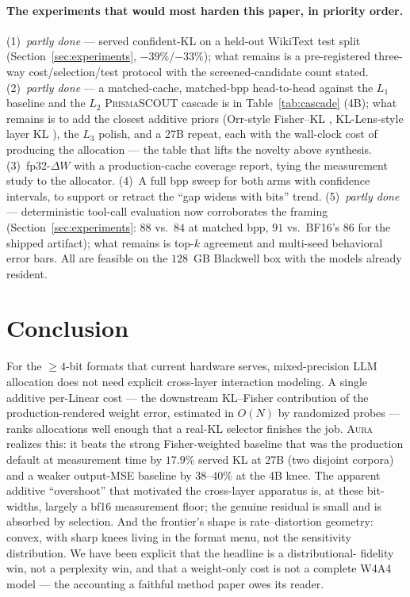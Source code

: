 \documentclass[11pt]{article}
\theoremstyle{plain}
\theoremstyle{definition}
\newcommand{\dW}{\Delta W}
\begin{document}
\paragraph{The experiments that would most harden this paper, in priority order.}
(1)~\emph{partly done} --- served confident-KL on a held-out WikiText test split
(Section~\ref{sec:experiments}, $-39\%$/$-33\%$); what remains is a pre-registered
three-way cost/selection/test protocol with the screened-candidate count stated.
(2)~\emph{partly done} --- a matched-cache, matched-bpp head-to-head against the
$L_1$ baseline and the $L_2$ \textsc{PrismaSCOUT} cascade is in
Table~\ref{tab:cascade} (4B); what remains is to add the closest additive priors
(Orr-style Fisher--KL \cite{orr2025}, KL-Lens-style layer KL \cite{kllens2026}),
the $L_3$ polish, and a 27B repeat, each with the wall-clock cost of producing the
allocation --- the table that lifts the novelty above synthesis.
(3)~fp32-$\dW$ with a production-cache coverage report, tying the measurement study
to the allocator. (4)~A full bpp sweep for both arms with confidence intervals, to
support or retract the ``gap widens with bits'' trend. (5)~\emph{partly done} ---
deterministic tool-call evaluation now corroborates the framing
(Section~\ref{sec:experiments}: $88$ vs.\ $84$ at matched bpp, $91$ vs.\ BF16's
$86$ for the shipped artifact); what remains is top-$k$ agreement and multi-seed
behavioral error bars. All are feasible on the $128$~GB Blackwell box with the
models already resident.

\section{Conclusion}\label{sec:conclusion}

For the $\ge 4$-bit formats that current hardware serves, mixed-precision LLM
allocation does not need explicit cross-layer interaction modeling. A single
additive per-Linear cost --- the downstream KL--Fisher contribution of the
production-rendered weight error, estimated in $O(N)$ by randomized probes ---
ranks allocations well enough that a real-KL selector finishes the job.
\textsc{Aura} realizes this: it beats the strong Fisher-weighted baseline that
was the production default at measurement time by $17.9\%$ served KL at 27B (two
disjoint corpora) and a weaker output-MSE baseline by $38\text{--}40\%$ at the 4B
knee.
The apparent additive ``overshoot'' that motivated the cross-layer apparatus is,
at these bit-widths, largely a bf16 measurement floor; the genuine residual is
small and is absorbed by selection. And the frontier's shape is rate--distortion
geometry: convex, with sharp knees living in the format menu, not the sensitivity
distribution. We have been explicit that the headline is a distributional-%
fidelity win, not a perplexity win, and that a weight-only cost is not a complete
W4A4 model --- the accounting a faithful method paper owes its reader.
\end{document}
